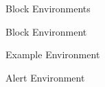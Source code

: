 \documentclass[\string~/GitHub/sthlmNordBeamerTheme/sthlmNordLightDemo.tex]{subfiles}
\begin{document}
\begin{frame}{Block Environments}
	\begin{block}{Block Environment}
		\lipsum[1][1]
	\end{block}
	\begin{exampleblock}{Example Environment}
		\lipsum[1][1]
	\end{exampleblock}
	\begin{alertblock}{Alert Environment}
		\lipsum[1][1]
	\end{alertblock}
\end{frame}
\end{document}
